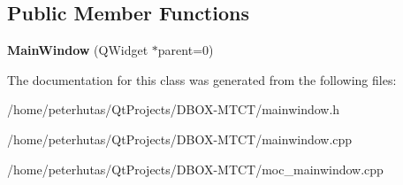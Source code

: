 \subsection*{Public Member Functions}
\begin{DoxyCompactItemize}
\item 
\mbox{\label{class_main_window_a8b244be8b7b7db1b08de2a2acb9409db}} 
{\bfseries Main\+Window} (Q\+Widget $\ast$parent=0)
\end{DoxyCompactItemize}


The documentation for this class was generated from the following files\+:\begin{DoxyCompactItemize}
\item 
/home/peterhutas/\+Qt\+Projects/\+D\+B\+O\+X-\/\+M\+T\+C\+T/mainwindow.\+h\item 
/home/peterhutas/\+Qt\+Projects/\+D\+B\+O\+X-\/\+M\+T\+C\+T/mainwindow.\+cpp\item 
/home/peterhutas/\+Qt\+Projects/\+D\+B\+O\+X-\/\+M\+T\+C\+T/moc\+\_\+mainwindow.\+cpp\end{DoxyCompactItemize}
